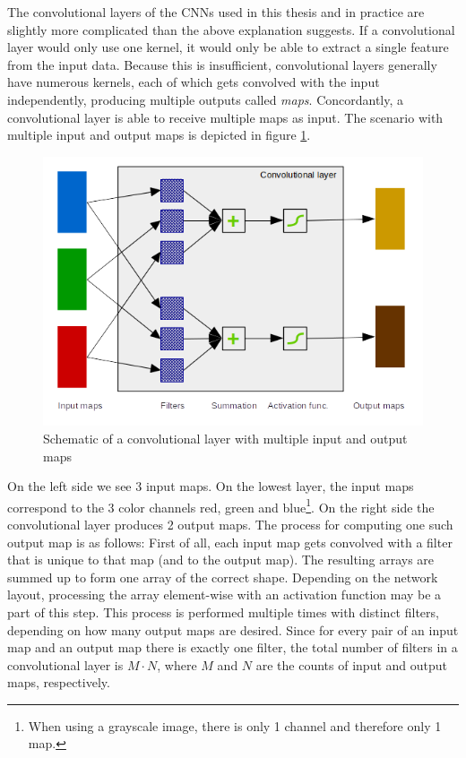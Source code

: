 \documentclass[11pt, a4paper]{article}
\begin{document}
The convolutional layers of the CNNs used in this thesis and in practice are slightly more complicated than the above explanation suggests. If a convolutional layer would only use one kernel, it would only be able to extract a single feature from the input data. Because this is insufficient, convolutional layers generally have numerous kernels, each of which gets convolved with the input independently, producing multiple outputs called \emph{maps}. Concordantly, a convolutional layer is able to receive multiple maps as input. The scenario with multiple input and output maps is depicted in figure \ref{fig:convolutional-layer-maps}.

\begin{figure}[h!tb]
	\centering
	\includegraphics{images/convolution_layer_maps.png}
	\caption[Input and output maps in convolutional layers]{Schematic of a convolutional layer with multiple input and output maps}
	\label{fig:convolutional-layer-maps}
\end{figure}

On the left side we see 3 input maps. On the lowest layer, the input maps correspond to the 3 color channels red, green and blue\footnote{When using a grayscale image, there is only 1 channel and therefore only 1 map.}. On the right side the convolutional layer produces 2 output maps. The process for computing one such output map is as follows: First of all, each input map gets convolved with a filter that is unique to that map (and to the output map). The resulting arrays are summed up to form one array of the correct shape. Depending on the network layout, processing the array element-wise with an activation function may be a part of this step. This process is performed multiple times with distinct filters, depending on how many output maps are desired. Since for every pair of an input map and an output map there is exactly one filter, the total number of filters in a convolutional layer is $M \cdot N$, where $M$ and $N$ are the counts of input and output maps, respectively.
\end{document}
